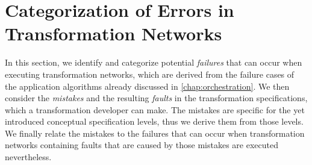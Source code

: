 \section{Categorization of Errors in Transformation Networks}


In this section, we identify and categorize potential \emph{failures} that can occur when executing transformation networks, which are derived from the failure cases of the application algorithms already discussed in \autoref{chap:orchestration}.
We then consider the \emph{mistakes} and the resulting \emph{faults} in the transformation specifications, which a transformation developer can make.
The mistakes are specific for the yet introduced conceptual specification levels, thus we derive them from those levels.
We finally relate the mistakes to the failures that can occur when transformation networks containing faults that are caused by those mistakes are executed nevertheless.




